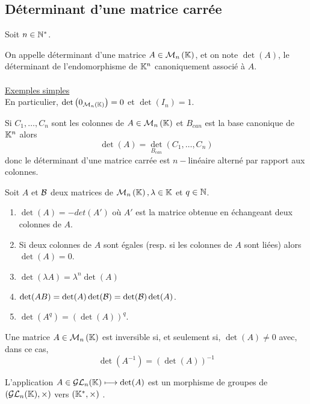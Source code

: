 \subsection{Déterminant d’une matrice carrée}
    Soit \(n \in  \Ns\).
\begin{defi}
    On appelle déterminant d’une matrice \(A \in  \M{n}\), et on note \(\det (A)\), le déterminant de l’endomorphisme de \(\K^n\) canoniquement associé à \(A\).\\~\\
    \underline{Exemples simples}\\
    En particulier, \(\det \paren{0_{\M{n}}} = 0\) et \(\det (I_n) = 1\).  
\end{defi}
\begin{defprop}
    Si \(C_1, \dots  , C_n\) sont les colonnes de \(A \in  \M{n}\) et \(B_{can}\) est la base canonique de \(\K^n\) alors
    \[\det(A) = \det_{B_{can}} (C_1, \dots  , C_n)\]
    donc le déterminant d’une matrice carrée est \(n-\)linéaire  alterné par rapport aux colonnes.
\end{defprop}

\begin{prop}
    Soit \(A\) et \(\cal{B}\) deux matrices de \(\M{n}, \lambda \in  \K\) et \(q \in \N\).
    \begin{enumerate}
        \item \(\det(A) = -det(A')\) où \(A'\) est la matrice obtenue en échangeant deux colonnes de \(A\).
        \item Si deux colonnes de \(A\) sont égales (resp. si les colonnes de \(A\) sont liées) alors \(\det(A) = 0\).
        \item \(\det(\lambda A) = \lambda^n \det(A)\)
        \item \(\det(AB) = \det(A) \det(\cal{B}) = \det(\cal{B}) \det(A)\).
        \item \(\det(A^q) = (\det(A))^q\).
    \end{enumerate}
\end{prop}

\begin{defprop}
    Une matrice \( A \in  \M{n}\) est inversible si, et seulement si, \(\det(A) \neq 0\) avec, dans ce cas, \[\det(A^{-1}) = (\det(A))^{-1}\]
\end{defprop}

\begin{defprop}
    L’application \(A \in  \cal{GL}_n(\K) \mapsto \det(A)\) est un morphisme de groupes de \((\cal{GL}_n(\K), \times)\) vers \((\Ks, \times)\) .
\end{defprop}

